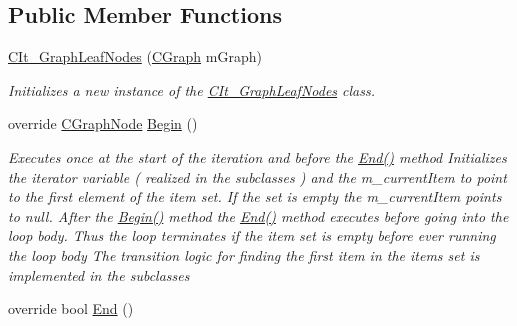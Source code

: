 \subsection*{Public Member Functions}
\begin{DoxyCompactItemize}
\item 
\hyperlink{class_graph_library_1_1_c_it___graph_leaf_nodes_a50c1682d64e5c562abdf9ede557daed7}{C\+It\+\_\+\+Graph\+Leaf\+Nodes} (\hyperlink{class_graph_library_1_1_c_graph}{C\+Graph} m\+Graph)
\begin{DoxyCompactList}\small\item\em Initializes a new instance of the \hyperlink{class_graph_library_1_1_c_it___graph_leaf_nodes}{C\+It\+\_\+\+Graph\+Leaf\+Nodes} class. \end{DoxyCompactList}\item 
override \hyperlink{class_graph_library_1_1_c_graph_node}{C\+Graph\+Node} \hyperlink{class_graph_library_1_1_c_it___graph_leaf_nodes_a7f9ce52d3e6c908a50abc991f77b805d}{Begin} ()
\begin{DoxyCompactList}\small\item\em Executes once at the start of the iteration and before the \hyperlink{class_graph_library_1_1_c_it___graph_leaf_nodes_a7a249d8774ff2fef55f20ae8dc1d0fac}{End()} method Initializes the iterator variable ( realized in the subclasses ) and the m\+\_\+current\+Item to point to the first element of the item set. If the set is empty the m\+\_\+current\+Item points to null. After the \hyperlink{class_graph_library_1_1_c_it___graph_leaf_nodes_a7f9ce52d3e6c908a50abc991f77b805d}{Begin()} method the \hyperlink{class_graph_library_1_1_c_it___graph_leaf_nodes_a7a249d8774ff2fef55f20ae8dc1d0fac}{End()} method executes before going into the loop body. Thus the loop terminates if the item set is empty before ever running the loop body The transition logic for finding the first item in the items set is implemented in the subclasses \end{DoxyCompactList}\item 
override bool \hyperlink{class_graph_library_1_1_c_it___graph_leaf_nodes_a7a249d8774ff2fef55f20ae8dc1d0fac}{End} ()

\end{DoxyCompactItemize}
